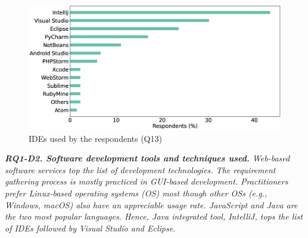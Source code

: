 \begin{figure}[t]
\centering
  \includegraphics[scale=0.18]{Figures/Respondents_IDEs}
  \caption{IDEs used by the respondents (Q13)}
  \label{fig:IDEs}
\end{figure}
\begin{tcolorbox}[flushleft upper,boxrule=1pt,arc=0pt,left=0pt,right=0pt,top=0pt,bottom=0pt,colback=white,after=\ignorespacesafterend\par\noindent]
\nd\it{\bf{RQ1-D2. Software development tools and techniques used.}} Web-based
software services top the list of development technologies. The requirement
gathering process is mostly practiced in GUI-based development. Practitioners prefer Linux-based operating
systems (OS) most though other OSs (e.g., Windows, macOS)
also have an appreciable usage rate. JavaScript and Java are the two most
popular languages. Hence, Java integrated tool,
IntelliJ, tops the list of IDEs followed by Visual Studio and Eclipse.
\end{tcolorbox}
